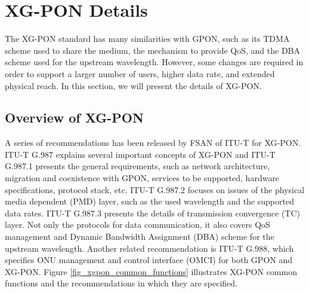 \section{XG-PON Details} \label{section_xgpon}

The XG-PON standard  has many similarities with GPON, such as its
TDMA scheme used to share the medium, the mechanism to provide
QoS, and the DBA scheme used for the upstream wavelength. However,
some changes are required in order to support a larger number of
users, higher data rate, and extended physical reach. In this
section, we will present the details of XG-PON.




\subsection{Overview of XG-PON}

A series of recommendations has been released by FSAN of ITU-T for
XG-PON. ITU-T G.987 explains several important concepts of XG-PON
and ITU-T G.987.1 presents the general requirements, such as
network architecture, migration and coexistence with GPON,
services to be supported, hardware specifications, protocol stack,
etc. ITU-T G.987.2 focuses on issues of the physical media
dependent (PMD) layer, such as the used wavelength and the
supported data rates. ITU-T G.987.3 presents the details of
transmission convergence (TC) layer. Not only the protocols for
data communication, it also covers QoS management and Dynamic
Bandwidth Assignment (DBA) scheme for the upstream wavelength.
Another related recommendation is ITU-T G.988, which specifies ONU
management and control interface (OMCI) for both GPON and XG-PON.
Figure \ref{fig_xgpon_common_functions} illustrates XG-PON common
functions and the recommendations in which they are specified.


